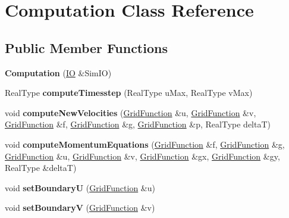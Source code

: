 \hypertarget{classComputation}{\section{Computation Class Reference}
\label{classComputation}
}
\subsection*{Public Member Functions}
\begin{DoxyCompactItemize}
\item 
\hypertarget{classComputation_afb63126d5f8b4eeae8ac39fa7be52b23}{{\bfseries Computation} (\hyperlink{classIO}{I\-O} \&Sim\-I\-O)}\label{classComputation_afb63126d5f8b4eeae8ac39fa7be52b23}

\item 
\hypertarget{classComputation_a5315aae8f2cc828435c20f89082438d0}{Real\-Type {\bfseries compute\-Timesstep} (Real\-Type u\-Max, Real\-Type v\-Max)}\label{classComputation_a5315aae8f2cc828435c20f89082438d0}

\item 
\hypertarget{classComputation_ae443fb8d9329df8460a3a2c898cc7a61}{void {\bfseries compute\-New\-Velocities} (\hyperlink{classGridFunction}{Grid\-Function} \&u, \hyperlink{classGridFunction}{Grid\-Function} \&v, \hyperlink{classGridFunction}{Grid\-Function} \&f, \hyperlink{classGridFunction}{Grid\-Function} \&g, \hyperlink{classGridFunction}{Grid\-Function} \&p, Real\-Type delta\-T)}\label{classComputation_ae443fb8d9329df8460a3a2c898cc7a61}

\item 
\hypertarget{classComputation_a89bb9373807439f68bafc74e67a4d38c}{void {\bfseries compute\-Momentum\-Equations} (\hyperlink{classGridFunction}{Grid\-Function} \&f, \hyperlink{classGridFunction}{Grid\-Function} \&g, \hyperlink{classGridFunction}{Grid\-Function} \&u, \hyperlink{classGridFunction}{Grid\-Function} \&v, \hyperlink{classGridFunction}{Grid\-Function} \&gx, \hyperlink{classGridFunction}{Grid\-Function} \&gy, Real\-Type \&delta\-T)}\label{classComputation_a89bb9373807439f68bafc74e67a4d38c}

\item 
\hypertarget{classComputation_a9f8ae5f9990bc96f6cbe68e7965f8f5e}{void {\bfseries set\-Boundary\-U} (\hyperlink{classGridFunction}{Grid\-Function} \&u)}\label{classComputation_a9f8ae5f9990bc96f6cbe68e7965f8f5e}

\item 
\hypertarget{classComputation_a95a948a82d9574cdee21e61bfca76f94}{void {\bfseries set\-Boundary\-V} (\hyperlink{classGridFunction}{Grid\-Function} \&v)}\label{classComputation_a95a948a82d9574cdee21e61bfca76f94}


\end{DoxyCompactItemize}
